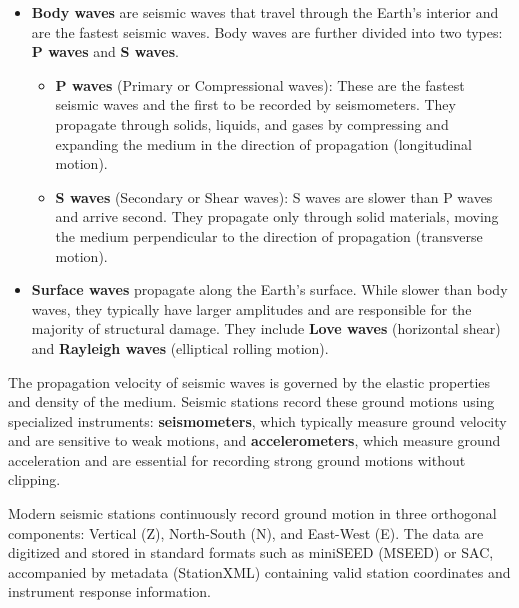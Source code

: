 \begin{itemize}
  \item \textbf{Body waves} are seismic waves that travel through the Earth's
    interior and are the fastest seismic waves. Body waves are further divided
    into two types: \textbf{P waves} and \textbf{S waves}.
    \begin{itemize}
      \item \textbf{P waves} (Primary or Compressional waves): These are the
        fastest seismic waves and the first to be recorded by seismometers.
        They propagate through solids, liquids, and gases by compressing and
        expanding the medium in the direction of propagation
        (longitudinal motion).
      \item \textbf{S waves} (Secondary or Shear waves): S waves are slower
        than P waves and arrive second. They propagate only through solid
        materials, moving the medium perpendicular to the direction of
        propagation (transverse motion).
    \end{itemize}
  \item \textbf{Surface waves} propagate along the Earth's surface. While
    slower than body waves, they typically have larger amplitudes and are
    responsible for the majority of structural damage. They include
    \textbf{Love waves} (horizontal shear) and \textbf{Rayleigh waves}
    (elliptical rolling motion).
\end{itemize}

The propagation velocity of seismic waves is governed by the elastic properties
and density of the medium. Seismic stations record these ground motions using
specialized instruments: \textbf{seismometers}, which typically measure ground
velocity and are sensitive to weak motions, and \textbf{accelerometers}, which
measure ground acceleration and are essential for recording strong ground
motions without clipping.

Modern seismic stations continuously record ground motion in three orthogonal
components: Vertical (Z), North-South (N), and East-West (E). The data are
digitized and stored in standard formats such as miniSEED (MSEED) or SAC,
accompanied by metadata (StationXML) containing valid station coordinates and
instrument response information.